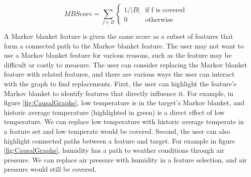 \begin{equation}
\label{eqn:MBConsistency}
MB Score = 
\sum_{f \in B}
    \begin{cases}
      1/|B| & \text{if f is covered}\\
      0 & \text{otherwise}
    \end{cases} 
\end{equation}

A Markov blanket feature is given the same score as a subset of features that form a connected path to the Markov blanket feature. The user may not want to use a Markov blanket feature for various reasons, such as the feature may be difficult or costly to measure. The user can consider replacing the Markov blanket feature with related features, and there are various ways the user can interact with the graph to find replacements. First, the user can highlight the feature's Markov blanket to identify features that directly influence it. For example, in figure \ref{fig:CausalGraphs}, low temperature is in the target's Markov blanket, and historic average temperature (highlighted in green) is a direct effect of low temperature. We can replace low temperature with historic average temperate in a feature set and low temperate would be covered. Second, the user can also highlight connected paths between a feature and target. For example in figure \ref{fig:CausalGraphs}, humidity has a path to weather conditions through air pressure. We can replace air pressure with humidity in a feature selection, and air pressure would still be covered. 

